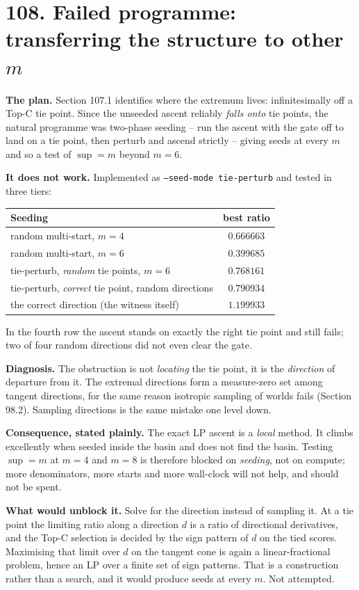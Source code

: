 \documentclass[9pt,twocolumn]{article}
\renewcommand{\_}{\CIGunderscore\allowbreak}
\begin{document}
\section*{108. Failed programme: transferring the structure to other $m$}
\textbf{The plan.} Section 107.1 identifies where the extremum lives: infinitesimally off a Top-C tie point. Since the unseeded ascent reliably \emph{falls onto} tie points, the natural programme was two-phase seeding -- run the ascent with the gate off to land on a tie point, then perturb and ascend strictly -- giving seeds at every $m$ and so a test of $\sup=m$ beyond $m=6$.

\textbf{It does not work.} Implemented as \texttt{--seed-mode tie-perturb} and tested in three tiers:
\begin{center}\scriptsize
\begin{tabularx}{0.98\columnwidth}{Xc}
\toprule
Seeding & best ratio\\
\midrule
random multi-start, $m=4$ & $0.666663$\\
random multi-start, $m=6$ & $0.399685$\\
tie-perturb, \emph{random} tie points, $m=6$ & $0.768161$\\
tie-perturb, \emph{correct} tie point, random directions & $0.790934$\\
the correct direction (the witness itself) & $\mathbf{1.199933}$\\
\bottomrule
\end{tabularx}
\end{center}
In the fourth row the ascent stands on exactly the right tie point and still fails; two of four random directions did not even clear the gate.

\textbf{Diagnosis.} The obstruction is not \emph{locating} the tie point, it is the \emph{direction} of departure from it. The extremal directions form a measure-zero set among tangent directions, for the same reason isotropic sampling of worlds fails (Section 98.2). Sampling directions is the same mistake one level down.

\textbf{Consequence, stated plainly.} The exact LP ascent is a \emph{local} method. It climbs excellently when seeded inside the basin and does not find the basin. Testing $\sup=m$ at $m=4$ and $m=8$ is therefore blocked on \emph{seeding}, not on compute; more denominators, more starts and more wall-clock will not help, and should not be spent.

\textbf{What would unblock it.} Solve for the direction instead of sampling it. At a tie point the limiting ratio along a direction $d$ is a ratio of directional derivatives, and the Top-C selection is decided by the sign pattern of $d$ on the tied scores. Maximising that limit over $d$ on the tangent cone is again a linear-fractional problem, hence an LP over a finite set of sign patterns. That is a construction rather than a search, and it would produce seeds at every $m$. Not attempted.
\end{document}
